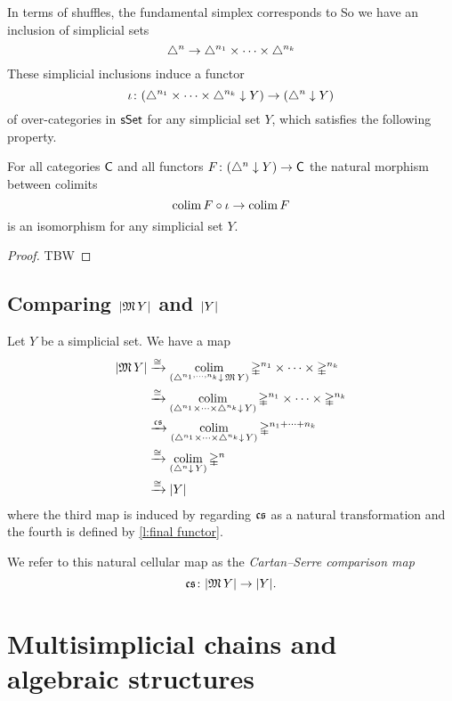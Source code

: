 In terms of shuffles, the fundamental simplex corresponds to 
So we have an inclusion of simplicial sets
\[
\triangle^n \to \triangle^{n_1} \times \dots \times \triangle^{n_k}
\]
These simplicial inclusions induce a functor
\[
\operatorname{\iota} \colon (\triangle^{n_1} \times \dots \times \triangle^{n_k} \downarrow Y) \to (\triangle^n \downarrow Y)
\]
of over-categories in $\mathsf{sSet}$ for any simplicial set $Y$, which satisfies the following property.

\begin{lemma} \label{l:final functor}
	For all categories $\mathsf{C}$ and all functors $F \colon (\triangle^n \downarrow Y) \to \mathsf{C}$ the natural morphism between colimits
	\[
	\operatorname*{colim} F \circ \operatorname{\iota} \to \operatorname*{colim} F
	\]
	is an isomorphism for any simplicial set $Y$.
\end{lemma}

\begin{proof}
	TBW
\end{proof}

\subsection{Comparing $\lvert\operatorname{\mathfrak{M}} Y\rvert$ and $\lvert Y\rvert$}

Let $Y$ be a simplicial set.
We have a map
\[
\begin{split}
\lvert\operatorname{\mathfrak{M}} Y\rvert & \xrightarrow{\cong}
\operatorname*{colim}_{(\triangle^{n_1, \dots, n_k} \downarrow \, \operatorname{\mathfrak{M}} Y)} \mathbb{\Delta}^{n_1} \times \cdots \times \mathbb{\Delta}^{n_k} \\ & \xrightarrow{\cong}
\operatorname*{colim}_{(\triangle^{n_1} \times \dots \times \triangle^{n_k} \downarrow \, Y)} \mathbb{\Delta}^{n_1} \times \cdots \times \mathbb{\Delta}^{n_k} \\ & \xrightarrow{\operatorname{\mathfrak{cs}}}
\operatorname*{colim}_{(\triangle^{n_1} \times \dots \times \triangle^{n_k} \downarrow \, Y)} \mathbb{\Delta}^{n_1 + \dots + n_k} \\ & \xrightarrow{\cong}
\operatorname*{colim}_{(\triangle^{n} \downarrow \, Y)} \mathbb{\Delta}^{n} \\ & \xrightarrow{\cong}
\lvert Y\rvert
\end{split}
\]
where the third map is induced by regarding $\operatorname{\mathfrak{cs}}$ as a natural transformation and the fourth is defined by \cref{l:final functor}.


We refer to this natural cellular map as the \textit{Cartan--Serre comparison map}
\[
\operatorname{\mathfrak{cs}} \colon \lvert\operatorname{\mathfrak{M}} Y\rvert \to \lvert Y\rvert.
\]

\section{Multisimplicial chains and algebraic structures}


